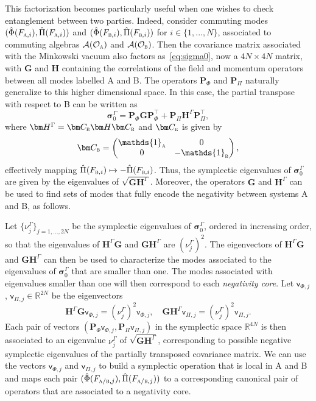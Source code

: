 \documentclass[letterpaper,12pt,titlepage,oneside,final]{book}
\newcommand{\openone}{\mathds{1}}
\newcommand{\mf}{\mathsf}%
\newcommand{\tc}[1]{\textsc{#1}}
\begin{document}
This factorization becomes particularly useful when one wishes to check entanglement between two parties. Indeed, consider commuting modes $(\hat{\Phi}(F_{\tc{a},i}),\hat{\Pi}(F_{\tc{a},i}))$ and $(\hat{\Phi}(F_{\tc{b},i}),\hat{\Pi}(F_{\tc{b},i}))$ for $i\in\{1,...,N\}$, associated to commuting algebras $\mathcal{A}(\mathcal{O}_\tc{a})$ and $\mathcal{A}(\mathcal{O}_\tc{b})$. Then the covariance matrix associated with the Minkowski vacuum also factors as~\eqref{eq:sigma0}, now a $4N\times4N$ matrix, with $\bm G$ and $\bm H$ containing the correlations of the field and momentum operators between all modes labelled A and B. The operators $\bm P_\Phi$ and $\bm P_\Pi$ naturally generalize to this higher dimensional space. In this case, the partial transpose with respect to B can be written as
\begin{equation}
    \bm \sigma_0^\Gamma = \bm P_\Phi \bm G \bm P_\Phi^\intercal + \bm P_\Pi \bm H^\Gamma \bm P_\Pi^\intercal,
\end{equation}
where $\bm H^\Gamma = \bm C_\tc{b} \bm H \bm C_\tc{b}$ and $\bm C_\tc{b}$ is given by
\begin{equation}
    \bm C_\tc{b} = \begin{pmatrix}\openone_\tc{a} & 0\\ 0 & -\openone_\tc{b}\end{pmatrix},
\end{equation}
effectively mapping $\hat{\Pi}(F_{\tc{b},i})\mapsto -\hat{\Pi}(F_{\tc{b},i})$. Thus, the symplectic eigenvalues of $\bm \sigma_0^\Gamma$ are given by the eigenvalues of $\sqrt{\bm G\bm H^\Gamma}$. Moreover, the operators $\bm G$ and $\bm H^\Gamma$ can be used to find sets of modes that fully encode the negativity between systems A and B, as follows.

Let $\{\nu_j^\Gamma\}_{j=1,...,2N}$ be the symplectic eigenvalues of $\bm \sigma_0^\Gamma$, ordered in increasing order, so that the eigenvalues of $\bm H^\Gamma \bm G$ and $\bm G \bm H^\Gamma$ are $(\nu_j^\Gamma)^2$. The eigenvectors of $\bm H^\Gamma \bm G$ and $\bm G \bm H^\Gamma$ can then be used to characterize the modes associated to the eigenvalues of $\bm \sigma_0^\Gamma$ that are smaller than one. The modes associated with eigenvalues smaller than one will then correspond to each \textit{negativity core}. Let $\mf v_{\Phi,j}$, $\mf v_{\Pi,j}\in \mathbb{R}^{2N}$ be the eigenvectors
\begin{equation}
    \bm H^\Gamma \bm G \mf v_{\Phi,j} = (\nu_j^\Gamma)^2\mf v_{\Phi,j}, \quad \bm G \bm H^\Gamma \mf v_{\Pi,j} = (\nu_j^\Gamma)^2\mf  v_{\Pi,j}.
\end{equation}
Each pair of vectors $(\bm P_\Phi\mf v_{\Phi,j},\bm P_\Pi\mf v_{\Pi,j})$ in the symplectic space $\mathbb{R}^{4N}$ is then associated to an eigenvalue $\nu_j^\Gamma$ of $\sqrt{\bm G \bm H^\Gamma}$, corresponding to possible negative symplectic eigenvalues of the partially transposed covariance matrix. We can use the vectors $\mf v_{\Phi,j}$ and $\mf v_{\Pi,j}$ to build a symplectic operation that is local in A and B and maps each pair $(\hat{\Phi}(F_{\tc{a}/\tc{b},j}),\hat{\Pi}(F_{\tc{a}/\tc{b},j}))$ to a corresponding canonical pair of operators that are associated to a negativity core.
\end{document}
